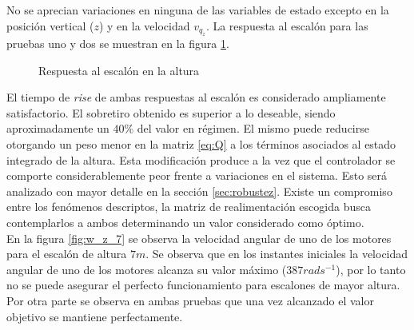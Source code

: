 \documentclass[main]{subfiles}
\begin{document}
No se aprecian variaciones en ninguna de las variables de estado excepto en la posici\'on vertical ($z$) y en la velocidad $v_{q_z}$. La respuesta al escal\'on para las pruebas uno y dos se muestran en la figura \ref{fig:hov_esc_z}. 
\begin{figure}
  \centering
  \caption{Respuesta al escal\'on en la altura}
  \label{fig:hov_esc_z}
\end{figure}

El tiempo de \emph{rise} de ambas respuestas al escal\'on es considerado ampliamente satisfactorio. El sobretiro obtenido es superior a lo deseable, siendo aproximadamente un $40\%$ del valor en r\'egimen. El mismo puede reducirse otorgando un peso menor en la matriz \ref{eq:Q} a los t\'erminos asociados al estado integrado de la altura. Esta modificaci\'on produce a la vez que el controlador se comporte considerablemente peor frente a variaciones en el sistema. Esto ser\'a analizado con mayor detalle en la secci\'on \ref{sec:robustez}. Existe un compromiso entre los fen\'omenos descriptos, la matriz de realimentaci\'on escogida busca contemplarlos a ambos determinando un valor considerado como \'optimo.\\ 

En la figura \ref{fig:w_z_7} se observa la velocidad angular de uno de los motores para el escal\'on de altura $7m$. Se observa que en los instantes iniciales la velocidad angular de uno de los motores alcanza su valor m\'aximo ($387rad s^{-1}$), por lo tanto no se puede asegurar el perfecto funcionamiento para escalones de mayor altura. Por otra parte se observa en ambas pruebas que una vez alcanzado el valor objetivo se mantiene perfectamente.\\
\end{document}
